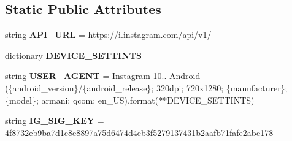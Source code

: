 \subsection*{Static Public Attributes}
\begin{DoxyCompactItemize}
\item 
\mbox{\label{class_instagram_a_p_i_1_1_instagram_a_p_i_1_1_instagram_a_p_i_a2b836f7940702d3f9a57eda3a7880ff4}} 
string {\bfseries A\+P\+I\+\_\+\+U\+RL} = \textquotesingle{}https\+://i.\+instagram.\+com/api/v1/\textquotesingle{}
\item 
dictionary {\bfseries D\+E\+V\+I\+C\+E\+\_\+\+S\+E\+T\+T\+I\+N\+TS}
\item 
\mbox{\label{class_instagram_a_p_i_1_1_instagram_a_p_i_1_1_instagram_a_p_i_ad1267bd0011aa632ba6bfa2e35245426}} 
string {\bfseries U\+S\+E\+R\+\_\+\+A\+G\+E\+NT} = \textquotesingle{}Instagram 10.. Android (\{android\+\_\+version\}/\{android\+\_\+release\}; 320dpi; 720x1280; \{manufacturer\}; \{model\}; armani; qcom; en\+\_\+\+U\+S)\textquotesingle{}.\+format($\ast$$\ast$\+D\+E\+V\+I\+C\+E\+\_\+\+S\+E\+T\+T\+I\+N\+T\+S)
\item 
\mbox{\label{class_instagram_a_p_i_1_1_instagram_a_p_i_1_1_instagram_a_p_i_a49d2a128fcd67161252660f3820e17b5}} 
string {\bfseries I\+G\+\_\+\+S\+I\+G\+\_\+\+K\+EY} = \textquotesingle{}4f8732eb9ba7d1c8e8897a75d6474d4eb3f5279137431b2aafb71fafe2abe178\textquotesingle{}
\item 
\mbox{\label{class_instagram_a_p_i_1_1_instagram_a_p_i_1_1_instagram_a_p_i_a825c4d88a8f4c01c4015f147a6557f93}} 
$$
\end{DoxyCompactItemize}
